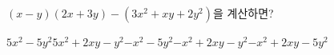 $(x-y)(2x+3y)-(3x^2+xy+2y^2)$을 계산하면?
\begin{choicesii}{$5x^2-5y^2$}{$5x^2+2xy-y^2$}{$-x^2-5y^2$}{$-x^2+2xy-y^2$}{$-x^2+2xy-5y^2$}\end{choicesii}
